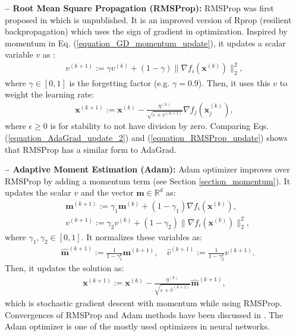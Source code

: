 \documentclass[lang=cn,10pt]{gorgeousnbook}
\numberwithin{equation}{section}%
\numberwithin{figure}{section}%
\begin{document}
\hfill\break
\textbf{-- Root Mean Square Propagation (RMSProp):}
RMSProp was first proposed in \cite{tieleman2012lecture} which is unpublished. 
It is an improved version of Rprop (resilient backpropagation) \cite{riedmiller1992rprop} which uses the sign of gradient in optimization.  
Inspired by momentum in Eq. (\ref{equation_GD_momentum_update}), it updates a scalar variable $v$ as \cite{hinton2012neural}:
\begin{align}
v^{(k+1)} := \gamma v^{(k)} + (1 - \gamma) \|\nabla f_i(\boldsymbol{x}^{(k)})\|_2^2,
\end{align}
where $\gamma \in [0,1]$ is the forgetting factor (e.g. $\gamma = 0.9$).
Then, it uses this $v$ to weight the learning rate:
\begin{align}\label{equation_RMSProp_update}
\boldsymbol{x}^{(k+1)} := \boldsymbol{x}^{(k)} - \frac{\eta^{(k)}}{\sqrt{\varepsilon + v^{(k+1)}}} \nabla f_{j}(\boldsymbol{x}_j^{(k)}),
\end{align}
where $\epsilon \geq 0$ is for stability to not have division by zero.
Comparing Eqs. (\ref{equation_AdaGrad_update_2}) and (\ref{equation_RMSProp_update}) shows that RMSProp has a similar form to AdaGrad. 


\hfill\break
\textbf{-- Adaptive Moment Estimation (Adam):}
Adam optimizer \cite{kingma2014adam} improves over RMSProp by adding a momentum term (see Section \ref{section_momentum}). 
It updates the scalar $v$ and the vector $\boldsymbol{m} \in \mathbb{R}^d$ as:
\begin{align}
& \boldsymbol{m}^{(k+1)} := \gamma_1 \boldsymbol{m}^{(k)} + (1 - \gamma_1) \nabla f_i(\boldsymbol{x}^{(k)}), \\
& v^{(k+1)} := \gamma_2 v^{(k)} + (1 - \gamma_2) \|\nabla f_i(\boldsymbol{x}^{(k)})\|_2^2,
\end{align}
where $\gamma_1, \gamma_2 \in [0,1]$. It normalizes these variables as:
\begin{align*}
& \widehat{\boldsymbol{m}}^{(k+1)} := \frac{1}{1-\gamma_1^k} \boldsymbol{m}^{(k+1)}, \quad \widehat{v}^{(k+1)} := \frac{1}{1-\gamma_2^k} v^{(k+1)}. 
\end{align*}
Then, it updates the solution as:
\begin{align}\label{equation_Adam_update}
\boldsymbol{x}^{(k+1)} := \boldsymbol{x}^{(k)} - \frac{\eta^{(k)}}{\sqrt{\varepsilon + \widehat{v}^{(k+1)}}} \widehat{\boldsymbol{m}}^{(k+1)},
\end{align}
which is stochastic gradient descent with momentum while using RMSProp. 
Convergences of RMSProp and Adam methods have been discussed in \cite{zou2019sufficient}. 
The Adam optimizer is one of the mostly used optimizers in neural networks. 
\end{document}
